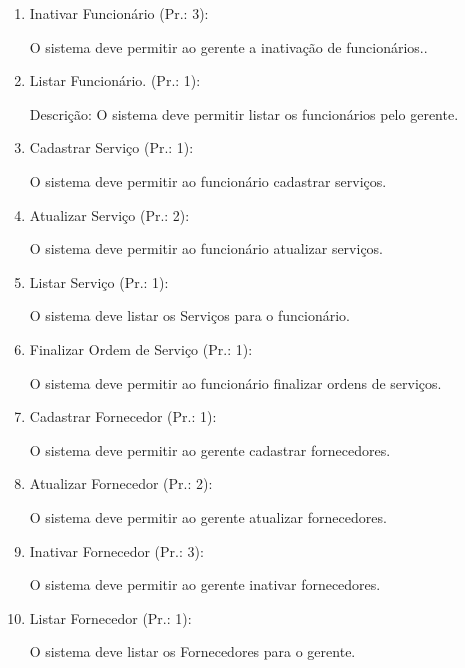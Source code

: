 \begin{enumerate}[
	label=RF\arabic{*}, 
	ref=(RF\arabic{*}),
	leftmargin=1.5em,
	itemindent=4.5em]
\item  Inativar Funcionário (Pr.: 3):\par
O sistema deve permitir ao gerente a inativação de funcionários..\par

\item Listar Funcionário. (Pr.: 1):\par
Descrição: O sistema deve permitir listar os funcionários pelo gerente.\par

\item Cadastrar Serviço (Pr.: 1):\par
O sistema deve permitir ao funcionário cadastrar serviços.\par

\item Atualizar Serviço (Pr.: 2):\par
O sistema deve permitir ao funcionário atualizar serviços.\par

\item Listar Serviço (Pr.: 1):\par
O sistema deve listar os Serviços para o funcionário.\par

\item Finalizar  Ordem de Serviço (Pr.: 1):\par
O sistema deve permitir ao funcionário finalizar ordens de serviços.\par

\item  Cadastrar Fornecedor (Pr.: 1):\par
O sistema deve permitir ao gerente cadastrar fornecedores.\par

\item Atualizar Fornecedor (Pr.: 2):\par
O sistema deve permitir ao gerente atualizar fornecedores.\par

\item Inativar Fornecedor (Pr.: 3):\par
O sistema deve permitir ao gerente inativar fornecedores.\par

\item Listar Fornecedor (Pr.: 1):\par
O sistema deve listar os Fornecedores para o gerente.\par


\end{enumerate}
